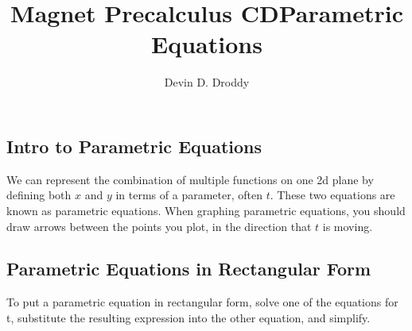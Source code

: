\documentclass{report}
\title{\Huge{Magnet Precalculus CD}Parametric Equations}
\author{\huge{Devin D. Droddy}}
\date{}
\begin{document}
\maketitle
\newpage%
\tableofcontents
\pagebreak

\chapter{}
\section{Intro to Parametric Equations}

We can represent the combination of multiple functions on one 2d plane by defining both $x$ and $y$ in terms of a parameter, often $t$. These two equations are known as parametric equations. When graphing parametric equations, you should draw arrows between the points you plot, in the direction that $t$ is moving.

%            

\section{Parametric Equations in Rectangular Form}

To put a parametric equation in rectangular form, solve one of the equations for t, substitute the resulting expression into the other equation, and simplify.

\end{document}
